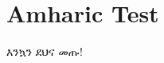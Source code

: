 \documentclass{article}
\begin{document}
\section{Amharic Test}

\begin{amharic}
እንኳን ደህና መጡ!
\end{amharic}
\end{document}
